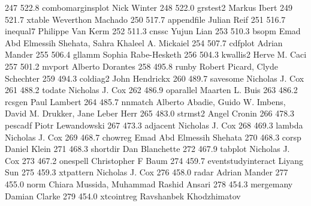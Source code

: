    247    522.8    combomarginsplot  Nick Winter                             
   248    522.0    grstest2      Markus Ibert                            
   249    521.7    xtable        Weverthon Machado                       
   250    517.7    appendfile    Julian Reif                             
   251    516.7    inequal7      Philippe Van Kerm                       
   252    511.3    cnssc         Yujun Lian                              
   253    510.3    bsopm         Emad Abd Elmessih Shehata, Sahra        
                                   Khaleel A. Mickaiel                     
   254    507.7    cdfplot       Adrian Mander                           
   255    506.4    gllamm        Sophia Rabe-Hesketh                     
   256    504.3    kwallis2      Herve M. Caci                           
   257    501.2    mvport        Alberto Dorantes                        
   258    495.8    runby         Robert Picard, Clyde Schechter          
   259    494.3    coldiag2      John Hendrickx                          
   260    489.7    savesome      Nicholas J. Cox                         
   261    488.2    todate        Nicholas J. Cox                         
   262    486.9    oparallel     Maarten L. Buis                         
   263    486.2    rcsgen        Paul Lambert                            
   264    485.7    nnmatch       Alberto Abadie, Guido W. Imbens, David  
                                   M. Drukker, Jane Leber Herr             
   265    483.0    strmst2       Angel Cronin                            
   266    478.3    pescadf       Piotr Lewandowski                       
   267    473.3    adjacent      Nicholas J. Cox                         
   268    469.3    lambda        Nicholas J. Cox                         
   269    468.7    chowreg       Emad Abd Elmessih Shehata               
   270    468.3    corsp         Daniel Klein                            
   271    468.3    shortdir      Dan Blanchette                          
   272    467.9    tabplot       Nicholas J. Cox                         
   273    467.2    onespell      Christopher F Baum                      
   274    459.7    eventstudyinteract  Liyang Sun                              
   275    459.3    xtpattern     Nicholas J. Cox                         
   276    458.0    radar         Adrian Mander                           
   277    455.0    norm          Chiara Mussida, Muhammad Rashid Ansari  
   278    454.3    mergemany     Damian Clarke                           
   279    454.0    xtcointreg    Ravshanbek Khodzhimatov                 
